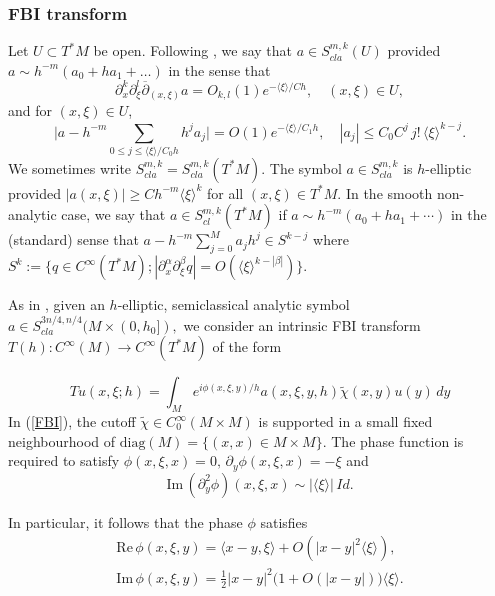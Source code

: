 \documentclass[11pt,reqno]{amsart}
\renewcommand{\Im} {\mathrm{Im\,}}
\renewcommand{\Re} {\mathrm{Re\,}}
\theoremstyle{definition}
\begin{document}
\subsubsection{FBI transform} \label{SS:FBI}
Let $U\subset T^*M$ be open. Following \cite{S82}, we say that $a \in S^{m,k}_{cla}(U)$  provided $a \sim h^{-m} (a_0 + h a_1 + \dots)$ in the sense that
\begin{equation*}
\partial_{x}^k \partial_{\xi}^l \overline{\partial}_{(x,\xi)} a = O_{k,l}(1) e^{- \langle \xi \rangle/Ch}, \quad (x,\xi)\in U, 
\end{equation*}
and for $(x , \xi) \in U$,
\begin{equation*}
  \Big| a - h^{-m} \sum_{0 \leq j \leq \langle \xi \rangle/C_0 h} h^{j} a_j \Big| = O(1) e^{- \langle \xi \rangle/C_1 h},\quad
 |a_j| \leq C_0 C^{j} \, j ! \, \langle \xi \rangle^{k-j}.
 \end{equation*}
We sometimes write $S^{m,k}_{cla}=S^{m,k}_{cla}(T^*M)$. The symbol $a \in S^{m,k}_{cla}$ is $h$-elliptic provided
$ |a(x,\xi)| \geq C h^{-m} \langle  \xi \rangle^k$ for all $(x,\xi) \in T^*M.$ In the smooth non-analytic case, we say that $a \in S^{m,k}_{cl}(T^*M)$ if $a \sim h^{-m} (a_0 +h a_1 + \cdots)$ in the (standard) sense that $ a - h^{-m} \sum_{j=0}^M a_j h^j \in S^{k -j} $ where 
$S^{k}:= \{ q \in C^{\infty}(T^*M);   |\partial_{x}^{\alpha} \partial_{\xi}^{\beta} q | = O(\langle \xi \rangle^{k-|\beta|}) \}.$ 


As in \cite{S82}, given an $h$-elliptic, semiclassical analytic symbol $a \in S^{3n/4,n/4}_{cla}(M \times (0,h_0]),$  we consider an intrinsic FBI transform $T(h):C^{\infty}(M) \to C^{\infty}(T^*M)$ of the form

\begin{equation} \label{FBI}
T u(x,\xi;h) = \int_{M} e^{i\phi(x,\xi,y)/h}  a(x,\xi,y,h) \tilde{\chi}( x, y) u(y) \, dy \end{equation}
In (\ref{FBI}), the cutoff $\tilde{\chi} \in C^{\infty}_{0}(M \times M)$ is supported in a  small fixed neighbourhood of $\text{diag}(M) = \{ (x,x) \in M \times M \}.$ The phase function is required to satisfy $\phi(x,\xi,x) = 0, \, \partial_y \phi(x,\xi,x) = - \xi$ and
$$ \Im (\partial_y^2 \phi)(x,\xi, x) \sim | \langle \xi \rangle | \, Id.$$

In particular, it follows that the phase $\phi$ satisfies
\begin{eqnarray} \label{phase}
\Re \phi(x,\xi,y) = \langle x-y, \xi \rangle + O(|x-y|^2 \langle \xi \rangle), \nonumber \\
\Im \phi(x,\xi,y)  = \frac{1}{2} |x-y|^2 \big( 1 + O(|x-y|) \big)  \langle \xi \rangle.
\end{eqnarray}
\end{document}
